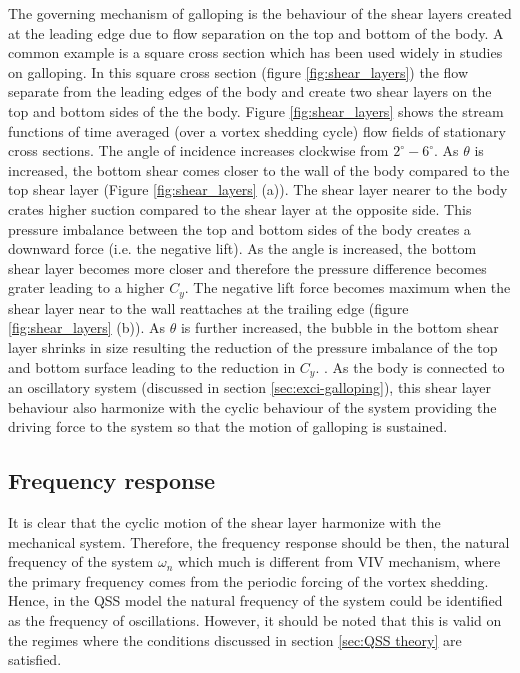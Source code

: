 The governing mechanism of galloping is the behaviour of the shear layers created at the leading edge due to flow separation  on the top and bottom of the body. A common example is a square cross section which has been used widely in studies on galloping. In this square cross section (figure \ref{fig:shear_layers}) the flow separate from the leading edges of the body and create two shear layers on the top and bottom sides of the the body. Figure \ref{fig:shear_layers} shows the stream functions of time averaged (over a vortex shedding cycle) flow fields of stationary cross sections. The angle of incidence increases clockwise from $2^{\circ}-6^{\circ}$. As $\theta$ is increased, the bottom shear comes closer to the wall of the body compared to the top shear layer (Figure \ref{fig:shear_layers} (a)). The shear layer nearer to the body crates higher suction compared to the shear layer at the opposite side. This pressure imbalance between the top and bottom sides of the body creates a downward force (i.e. the negative lift). As the angle is increased, the bottom shear layer becomes more closer and therefore the pressure difference becomes grater leading to a higher $C_{y}$. The negative lift force becomes maximum when the shear layer near to the wall reattaches at the trailing edge (figure \ref{fig:shear_layers} (b)). As $\theta$ is further increased, the bubble in the bottom shear layer shrinks in size resulting the reduction of the pressure imbalance of the top and bottom surface leading to the reduction in $C_{y}$. . As the body is connected to an oscillatory system (discussed in section \ref{sec:exci-galloping}), this shear layer behaviour also harmonize with the cyclic behaviour of the system providing the driving force to the system so that the motion of galloping is sustained.



\subsection{Frequency response}
 
 It is clear that the cyclic motion of the shear layer harmonize with the mechanical system. Therefore, the frequency response should be then, the natural frequency of the system $\omega_{n}$ which much is different from VIV mechanism, where the primary frequency comes from the periodic forcing of the vortex shedding. Hence, in the QSS model the natural frequency of the system could be identified as the frequency of oscillations. However, it should be  noted that this is valid on the regimes where the conditions discussed in section \ref{sec:QSS theory} are satisfied. 
 
